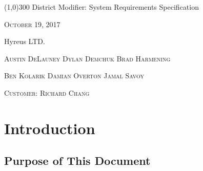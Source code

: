 \documentclass{article}
\begin{document}
\begin{titlepage}
	\begin{center}
	\line(1,0){300} 
	\huge{ District Modifier: System Requirements Specification} \\
	
	\vspace{1mm}

	\textsc{\normalsize October 19, 2017}

	\vspace{10mm}
	
	\textsc Hyreus LTD.
	
	\vspace{4mm}

	\textsc{\normalsize Austin DeLauney \quad Dylan Demchuk \quad Brad Harmening}
	
	\vspace{2mm}
	
	\textsc{\normalsize Ben Kolarik \quad Damian Overton \quad Jamal Savoy}

	\vspace{2mm}
	
	\textsc{\normalsize Customer: Richard Chang}


	\thispagestyle{empty}
	
\end{center}
\end{titlepage}



\tableofcontents
\thispagestyle{empty}
\cleardoublepage

\setcounter{page}{1}



\section{Introduction}\label{sec:intro}


\subsection{Purpose of This Document}

\vspace{2.5mm}
\end{document}
